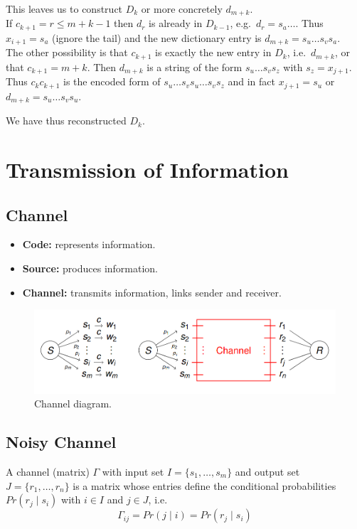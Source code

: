 \documentclass[11pt]{article}
\begin{document}
This leaves us to construct $D_k$ or more concretely $d_{m + k}$. \\

If $c_{k + 1} = r \leq m + k - 1$ then $d_r$ is already in $D_{k - 1}$, e.g.\ $d_r = s_a \ldots$.
Thus $x_{i + 1} = s_a$ (ignore the tail) and the new dictionary entry is $d_{m + k} = s_u \ldots s_v s_a$. \\

The other possibility is that $c_{k + 1}$ is exactly the new entry in $D_k$, i.e.\ $d_{m + k}$, or that $c_{k + 1} = m + k$.
Then $d_{m + k}$ is a string of the form $s_u \ldots s_v s_z$ with $s_z = x_{j + 1}$.
Thus $c_k c_{k + 1}$ is the encoded form of $s_u \ldots s_v s_u \ldots s_v s_z$ and in fact $x_{j + 1} = s_u$ or $d_{m + k} = s_u \ldots s_v s_u$.

We have thus reconstructed $D_k$.

\section{Transmission of Information}
\subsection{Channel}
\begin{itemize}
  \item \textbf{Code:} represents information.
  \item \textbf{Source:} produces information.
  \item \textbf{Channel:} transmits information, links sender and receiver.
\end{itemize}

\begin{figure}[h]
  \caption{Channel diagram.}
  \centering
  \includegraphics[width=\textwidth]{channel}
\end{figure}

\subsection{Noisy Channel}
A channel (matrix) $\Gamma$ with input set $I = \{ s_1, \ldots, s_m \}$ and output set $J = \{ r_1, \ldots, r_n \}$ is a matrix whose entries define the conditional probabilities $Pr(r_j  \mid s_i)$ with $i \in I$ and $j \in J$, i.e.
\[
  \Gamma_{ij} = Pr(j \mid i) = Pr(r_j \mid s_i)
\]
\end{document}
